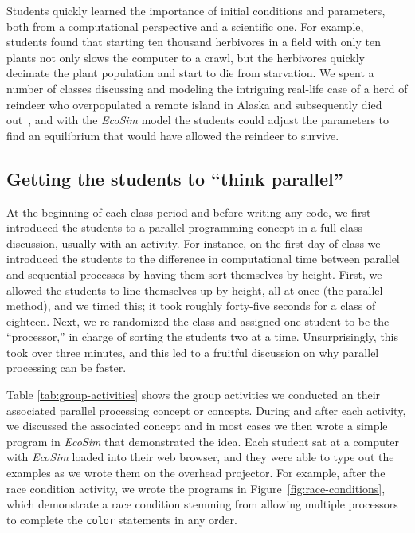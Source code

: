 \documentclass{sig-alternate}
\begin{document}
Students quickly learned the importance of initial conditions and parameters, both from a 
computational perspective and a scientific one.  For example, students found that starting 
ten thousand herbivores in a field with only ten plants
not only slows the computer to a crawl, but the herbivores quickly decimate the plant population
and start to die from starvation.  We spent a number of classes discussing and
modeling the intriguing real-life case of a herd of reindeer who overpopulated a remote
island in Alaska and subsequently died out~\cite{klein1968introduction,stMatthewIsland}, 
and with the \emph{EcoSim} model the students could adjust the parameters to find an
equilibrium that would have allowed the reindeer to survive.

\subsection{Getting the students to ``think parallel''}
At the beginning of each class period and before writing any code, we first introduced the 
students to a parallel programming concept in a full-class discussion, usually with an activity.
For instance, on the first day of class we introduced the students to the difference in
computational time between parallel and sequential processes by having them sort themselves
by height.  First, we allowed the students to line themselves up by height, all at once (the
parallel method), and we timed this; it took roughly forty-five seconds for a class of eighteen.
Next, we re-randomized the class and assigned one student to be the ``processor,'' in charge
of sorting the students two at a time.  Unsurprisingly, this took over three minutes, and this
led to a fruitful discussion on why parallel processing can be faster.

Table \ref{tab:group-activities} shows the group activities we conducted an their associated
parallel processing concept or concepts.  During and after each activity, we discussed the
associated concept and in most cases we then wrote a simple program in \emph{EcoSim} that
demonstrated the idea.  Each student sat at a computer with \emph{EcoSim} loaded into their
web browser, and they were able to type out the examples as we wrote them on the overhead 
projector.
For example, after the race condition activity, we wrote the programs in 
Figure~\ref{fig:race-conditions}, which demonstrate a race condition stemming from allowing multiple
processors to complete the \texttt{color} statements in any order.
\end{document}
